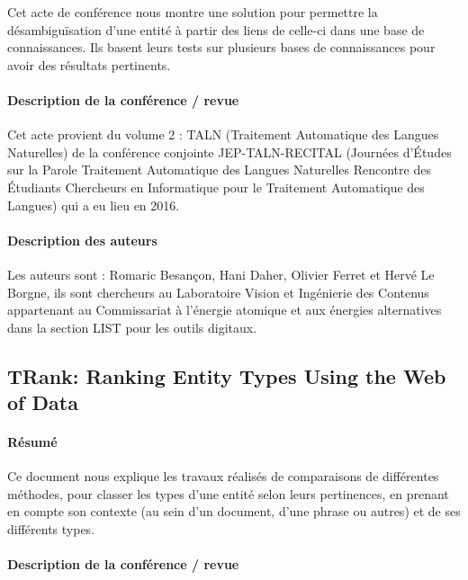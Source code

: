 \documentclass{article}
\begin{document}
Cet acte de conférence nous montre une solution pour permettre la désambiguïsation d'une entité à partir des liens de celle-ci dans une base de connaissances. Ils basent leurs tests sur plusieurs bases de connaissances pour avoir des résultats pertinents.


\paragraph{Description de la conférence / revue}

Cet acte provient du volume 2 : TALN (Traitement Automatique des Langues Naturelles) de la conférence conjointe JEP-TALN-RECITAL (Journées d’Études sur la Parole Traitement Automatique des Langues Naturelles Rencontre des Étudiants Chercheurs en Informatique pour le Traitement Automatique des Langues) qui a eu lieu en 2016.


\paragraph{Description des auteurs}

Les auteurs sont : Romaric Besançon, Hani Daher, Olivier Ferret et Hervé Le Borgne, ils sont chercheurs au Laboratoire Vision et Ingénierie des Contenus appartenant au Commissariat à l'énergie atomique et aux énergies alternatives dans la section LIST pour les outils digitaux.

\subsection{TRank: Ranking Entity Types Using the Web of Data\cite{article-12}}

\paragraph{Résumé}

Ce document nous explique les travaux réalisés de comparaisons de différentes méthodes, pour classer les types d'une entité selon leurs pertinences, en prenant en compte son contexte (au sein d'un document, d'une phrase ou autres) et de ses différents types.


\paragraph{Description de la conférence / revue}
\end{document}
